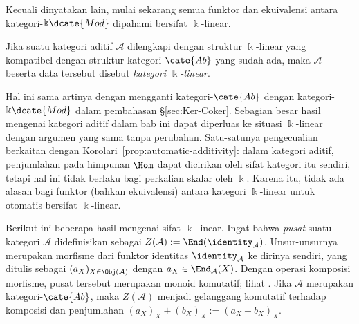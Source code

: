Kecuali dinyatakan lain, mulai sekarang semua funktor dan ekuivalensi antara
kategori-$\Bbbk\dcate{Mod}$ dipahami bersifat $\Bbbk$-linear.

\begin{definisi}\label{def:k-linear-cat}
	Jika suatu kategori aditif $\mathcal{A}$ dilengkapi dengan struktur
	$\Bbbk$-linear yang kompatibel dengan struktur kategori-$\cate{Ab}$ yang
	sudah ada, maka $\mathcal{A}$ beserta data tersebut disebut
	\emph{kategori $\Bbbk$-linear}.
\end{definisi}

Hal ini sama artinya dengan mengganti kategori-$\cate{Ab}$ dengan
kategori-$\Bbbk\dcate{Mod}$ dalam pembahasan \S\ref{sec:Ker-Coker}. Sebagian
besar hasil mengenai kategori aditif dalam bab ini dapat diperluas ke situasi
$\Bbbk$-linear dengan argumen yang sama tanpa perubahan. Satu-satunya pengecualian
berkaitan dengan Korolari~\ref{prop:automatic-additivity}: dalam kategori
aditif, penjumlahan pada himpunan $\Hom$ dapat dicirikan oleh sifat kategori itu
sendiri, tetapi hal ini tidak berlaku bagi perkalian skalar oleh $\Bbbk$.
Karena itu, tidak ada alasan bagi funktor (bahkan ekuivalensi) antara kategori
$\Bbbk$-linear untuk otomatis bersifat $\Bbbk$-linear.

Berikut ini beberapa hasil mengenai sifat $\Bbbk$-linear. Ingat bahwa
\emph{pusat} suatu kategori $\mathcal{A}$ didefinisikan sebagai
 
$Z(\mathcal{A}) := \End(\identity_{\mathcal{A}})$. Unsur-unsurnya merupakan
morfisme dari funktor identitas $\identity_{\mathcal{A}}$ ke dirinya sendiri,
yang ditulis sebagai $(a_X)_{X \in \Obj(\mathcal{A})}$ dengan
$a_X \in \End_{\mathcal{A}}(X)$. Dengan operasi komposisi morfisme, pusat tersebut
merupakan monoid komutatif; lihat \cite[Definisi 2.3.8,
Proposisi 2.3.9]{Li1}. Jika $\mathcal{A}$ merupakan kategori-$\cate{Ab}$, maka
$Z(\mathcal{A})$ menjadi gelanggang komutatif terhadap komposisi dan
penjumlahan
$(a_X)_X + (b_X)_X := (a_X+b_X)_X$.

